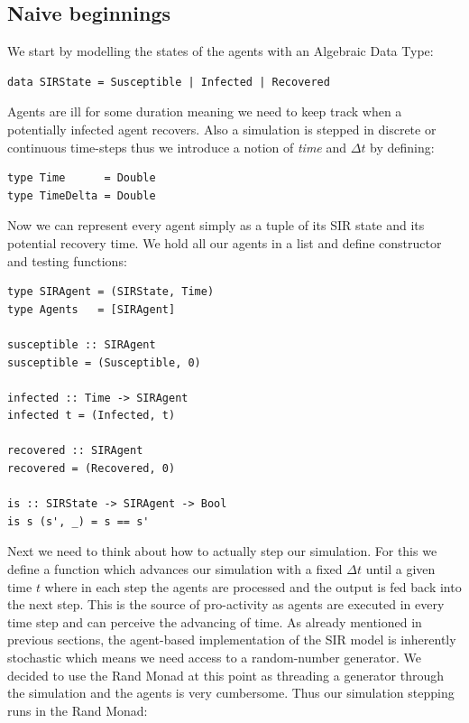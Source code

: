 \subsection{Naive beginnings}
We start by modelling the states of the agents with an Algebraic Data Type:

\begin{verbatim}
data SIRState = Susceptible | Infected | Recovered
\end{verbatim}

Agents are ill for some duration meaning we need to keep track when a potentially infected agent recovers. Also a simulation is stepped in discrete or continuous time-steps thus we introduce a notion of \textit{time} and $\Delta t$ by defining:

\begin{verbatim}
type Time      = Double
type TimeDelta = Double
\end{verbatim}

Now we can represent every agent simply as a tuple of its SIR state and its potential recovery time. We hold all our agents in a list and define constructor and testing functions:
\begin{verbatim}
type SIRAgent = (SIRState, Time)
type Agents   = [SIRAgent]

susceptible :: SIRAgent
susceptible = (Susceptible, 0)

infected :: Time -> SIRAgent
infected t = (Infected, t)

recovered :: SIRAgent
recovered = (Recovered, 0)

is :: SIRState -> SIRAgent -> Bool
is s (s', _) = s == s'
\end{verbatim}

Next we need to think about how to actually step our simulation. For this we define a function which advances our simulation with a fixed $\Delta t$ until a given time $t$ where in each step the agents are processed and the output is fed back into the next step. This is the source of pro-activity as agents are executed in every time step and can perceive the advancing of time.
As already mentioned in previous sections, the agent-based implementation of the SIR model is inherently stochastic which means we need access to a random-number generator. We decided to use the Rand Monad at this point as threading a generator through the simulation and the agents is very cumbersome. Thus our simulation stepping runs in the Rand Monad:

